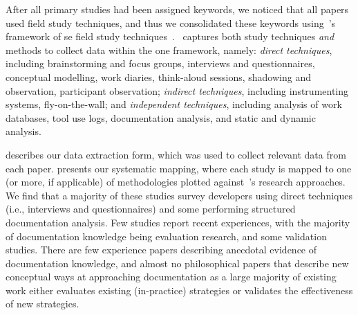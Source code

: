 After all primary studies had been assigned keywords, we noticed that all papers used field study techniques, and thus we consolidated these keywords using~\citeauthor{Singer:2007tu}'s framework of \gls{se} field study techniques~\citep{Singer:2007tu}.~\citeauthor{Singer:2007tu} captures both study techniques \textit{and} methods to collect data within the one framework, namely: \textit{direct techniques}, including brainstorming and focus groups, interviews and questionnaires, conceptual modelling, work diaries, think-aloud sessions, shadowing and observation, participant observation; \textit{indirect techniques}, including instrumenting systems, fly-on-the-wall; and \textit{independent techniques}, including analysis of work databases, tool use logs, documentation analysis, and static and dynamic analysis. 

 describes our data extraction form, which was used to collect relevant data from each paper.  presents our systematic mapping, where each study is mapped to one (or more, if applicable) of methodologies plotted against~\citeauthor{Wieringa:2006vd}'s research approaches. We find that a majority of these studies survey developers using direct techniques (i.e., interviews and questionnaires) and some performing structured documentation analysis. Few studies report recent experiences, with the majority of  documentation knowledge being evaluation research, and some validation studies. There are few experience papers describing anecdotal evidence of  documentation knowledge, and almost no philosophical papers that describe new conceptual ways at approaching  documentation as a large majority of existing work either evaluates existing (in-practice) strategies or validates the effectiveness of new strategies.

